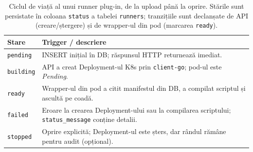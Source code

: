 \begin{table}[!htbp]
\centering
\caption[Ciclul de viață runner plug-in]{Ciclul de viață al unui runner plug-in, de la upload până la
oprire. Stările sunt persistate în coloana \texttt{status} a tabelei
\texttt{runners}; tranzițiile sunt declanșate de API (creare/ștergere) și
de wrapper-ul din pod (marcarea \texttt{ready}).}
\label{tab:plugin_lifecycle}
\small
\begin{tabularx}{\columnwidth}{l X}
\toprule
\textbf{Stare} & \textbf{Trigger / descriere} \\
\midrule
\texttt{pending}  & INSERT inițial în DB; răspunsul HTTP returnează imediat. \\
\texttt{building} & API a creat Deployment-ul K8s prin \texttt{client-go}; pod-ul este \emph{Pending}. \\
\texttt{ready}    & Wrapper-ul din pod a citit manifestul din DB, a compilat scriptul și ascultă pe coadă. \\
\texttt{failed}   & Eroare la crearea Deployment-ului sau la compilarea scriptului; \texttt{status\_message} conține detalii. \\
\texttt{stopped}  & Oprire explicită; Deployment-ul este șters, dar rândul rămâne pentru audit (opțional). \\
\bottomrule
\end{tabularx}
\end{table}
